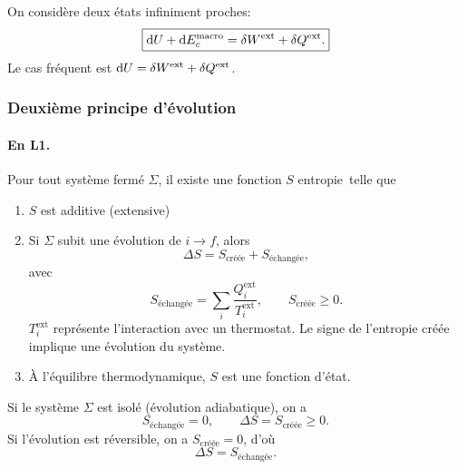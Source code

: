                 On considère deux états infiniment proches:
                \begin{equation*}
                    \boxed{
                        \mathrm{d} U+\mathrm{d} E_c^{\text{macro}}=\delta W^{\text{ext}}+\delta Q^{\text{ext}}.
                    }
                \end{equation*}
                Le cas fréquent est $\mathrm{d} U=\delta W^{\text{ext}}+\delta Q^{\text{ext}}$.

        \subsubsection{Deuxième principe \og d'évolution\fg}

            \paragraph{En L1.}
                Pour tout système fermé $\Sigma$, il existe une fonction $S$ \og entropie\fg~telle que
                \begin{enumerate}
                    \item $S$ est additive (extensive)
                    \item Si $\Sigma$ subit une évolution de $i\to f$, alors
                    \begin{equation*}
                        \boxed{
                            \Delta S=S_{\text{créée}}+S_{\text{échangée}},
                        }
                    \end{equation*}
                    avec
                    \begin{equation*}
                        S_{\text{échangée}}=\sum_{i}\frac{Q_i^{\text{ext}}}{T_i^{\text{ext}}},\qquad S_{\text{créée}}\geqslant 0.
                    \end{equation*}
                    $T_i^{\text{ext}}$ représente l'interaction avec un thermostat. Le signe de l'entropie créée implique une évolution du système.
                    \item À l'équilibre thermodynamique, $S$ est une fonction d'état.
                \end{enumerate}

                Si le système $\Sigma$ est isolé (évolution adiabatique), on a 
                \begin{equation*}
                    \boxed{
                        S_{\text{échangée}}=0,\qquad\Delta S=S_{\text{créée}}\geqslant0.
                    }
                \end{equation*}
                Si l'évolution est réversible, on a $S_{\text{créée}}=0$, d'où 
                \begin{equation*}
                    \boxed{
                        \Delta S=S_{\text{échangée}}.
                    }
                \end{equation*}

